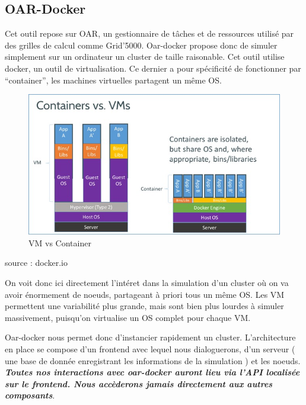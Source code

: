 \documentclass[a4paper,10pt]{article}
\begin{document}
\subsection{OAR-Docker}
Cet outil repose sur OAR, un gestionnaire de tâches et de ressources utilisé par des grilles de calcul comme Grid'5000.
Oar-docker propose donc de simuler simplement sur un ordinateur un cluster de taille raisonable. Cet outil utilise docker, un outil de virtualisation.
Ce dernier a pour spécificité de fonctionner par ``container'', les machines virtuelles partagent un même OS.
\begin{figure}[h]
  \begin{center}
    \includegraphics[scale=0.3]{./docker.png}
   \caption{\label{docker} VM vs Container}
  \end{center}
\end{figure}

source : docker.io

On voit donc ici directement l'intéret dans la simulation d'un cluster où on va avoir énormement de noeuds, partageant à priori tous un même OS.
Les VM permettent une variabilité plus grande, mais sont bien plus lourdes à simuler massivement, puisqu'on virtualise un OS complet pour chaque VM.
\vspace{0.5cm}

Oar-docker nous permet donc d'instancier rapidement un cluster.
L'architecture en place se compose d'un frontend avec lequel nous dialoguerons, d'un serveur ( une base de donnée enregistrant les informations de la simulation )
et les noeuds. \textbf{\textit{Toutes nos interactions avec oar-docker auront lieu via l'API localisée sur le frontend. Nous accèderons jamais directement aux autres composants}}.

\vspace{0.5cm}
\end{document}
